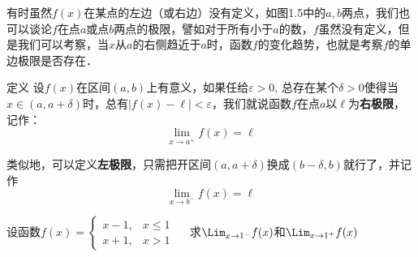 有时虽然$f(x)$在某点的左边（或右边）没有定义，如图1.5中的$a,b$两点，我们也可以谈论$f$在点$a$或点$b$两点的极限，譬如对于所有小于$a$的数，$f$虽然没有定义，但是我们可以考察，当$x$从$a$的右侧趋近于$a$时，函数$f$的变化趋势，也就是考察$f$的单边极限是否存在．

\begin{figure}[htp]
    \centering
{}
    \caption{}
\end{figure}

\begin{blk}{定义}
     设$f(x)$在区间$(a,b)$上有意义，如果任给$\varepsilon>0$, 总存在某个$\delta>0$使得当$x\in (a,a+\delta)$时，总有$|f(x)-\ell|<\varepsilon$，我们就说函数$f$在点$a$以$\ell$为\textbf{右极限}，记作：
\[\lim_{x\to a^+}f(x)=\ell\]
\end{blk}

类似地，可以定义\textbf{左极限}，只需把开区间$(a,a+\delta)$换成$(b-\delta,b)$就行了，并记作
\[\lim_{x\to b^-} f(x)=\ell\]

\begin{example}
    设函数$f(x)=\begin{cases}
        x-1,&x\le 1\\
x+1,&x>1
    \end{cases}\quad $    
    求$\Lim_{x\to 1^-}f(x)$和$\Lim_{x\to 1^+}f(x)$
\end{example}


